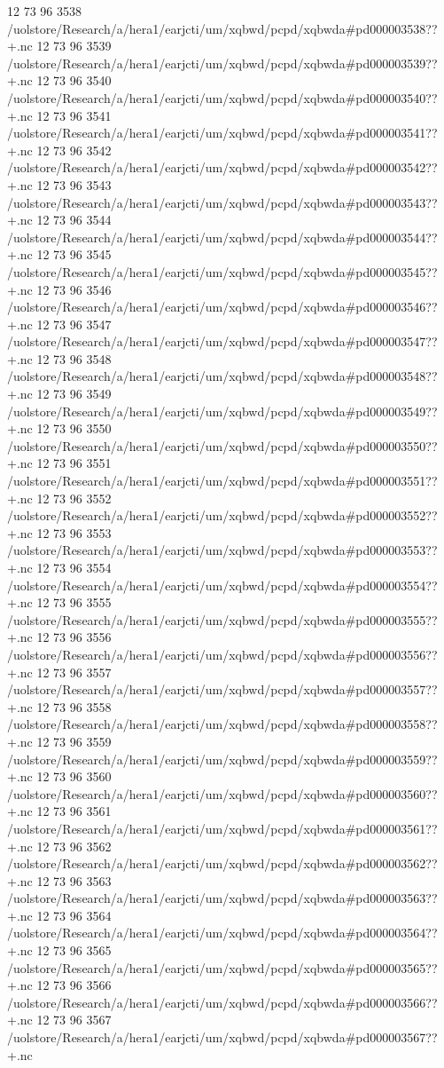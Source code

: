 12 73 96
3538
/uolstore/Research/a/hera1/earjcti/um/xqbwd/pcpd/xqbwda#pd000003538??+.nc
12 73 96
3539
/uolstore/Research/a/hera1/earjcti/um/xqbwd/pcpd/xqbwda#pd000003539??+.nc
12 73 96
3540
/uolstore/Research/a/hera1/earjcti/um/xqbwd/pcpd/xqbwda#pd000003540??+.nc
12 73 96
3541
/uolstore/Research/a/hera1/earjcti/um/xqbwd/pcpd/xqbwda#pd000003541??+.nc
12 73 96
3542
/uolstore/Research/a/hera1/earjcti/um/xqbwd/pcpd/xqbwda#pd000003542??+.nc
12 73 96
3543
/uolstore/Research/a/hera1/earjcti/um/xqbwd/pcpd/xqbwda#pd000003543??+.nc
12 73 96
3544
/uolstore/Research/a/hera1/earjcti/um/xqbwd/pcpd/xqbwda#pd000003544??+.nc
12 73 96
3545
/uolstore/Research/a/hera1/earjcti/um/xqbwd/pcpd/xqbwda#pd000003545??+.nc
12 73 96
3546
/uolstore/Research/a/hera1/earjcti/um/xqbwd/pcpd/xqbwda#pd000003546??+.nc
12 73 96
3547
/uolstore/Research/a/hera1/earjcti/um/xqbwd/pcpd/xqbwda#pd000003547??+.nc
12 73 96
3548
/uolstore/Research/a/hera1/earjcti/um/xqbwd/pcpd/xqbwda#pd000003548??+.nc
12 73 96
3549
/uolstore/Research/a/hera1/earjcti/um/xqbwd/pcpd/xqbwda#pd000003549??+.nc
12 73 96
3550
/uolstore/Research/a/hera1/earjcti/um/xqbwd/pcpd/xqbwda#pd000003550??+.nc
12 73 96
3551
/uolstore/Research/a/hera1/earjcti/um/xqbwd/pcpd/xqbwda#pd000003551??+.nc
12 73 96
3552
/uolstore/Research/a/hera1/earjcti/um/xqbwd/pcpd/xqbwda#pd000003552??+.nc
12 73 96
3553
/uolstore/Research/a/hera1/earjcti/um/xqbwd/pcpd/xqbwda#pd000003553??+.nc
12 73 96
3554
/uolstore/Research/a/hera1/earjcti/um/xqbwd/pcpd/xqbwda#pd000003554??+.nc
12 73 96
3555
/uolstore/Research/a/hera1/earjcti/um/xqbwd/pcpd/xqbwda#pd000003555??+.nc
12 73 96
3556
/uolstore/Research/a/hera1/earjcti/um/xqbwd/pcpd/xqbwda#pd000003556??+.nc
12 73 96
3557
/uolstore/Research/a/hera1/earjcti/um/xqbwd/pcpd/xqbwda#pd000003557??+.nc
12 73 96
3558
/uolstore/Research/a/hera1/earjcti/um/xqbwd/pcpd/xqbwda#pd000003558??+.nc
12 73 96
3559
/uolstore/Research/a/hera1/earjcti/um/xqbwd/pcpd/xqbwda#pd000003559??+.nc
12 73 96
3560
/uolstore/Research/a/hera1/earjcti/um/xqbwd/pcpd/xqbwda#pd000003560??+.nc
12 73 96
3561
/uolstore/Research/a/hera1/earjcti/um/xqbwd/pcpd/xqbwda#pd000003561??+.nc
12 73 96
3562
/uolstore/Research/a/hera1/earjcti/um/xqbwd/pcpd/xqbwda#pd000003562??+.nc
12 73 96
3563
/uolstore/Research/a/hera1/earjcti/um/xqbwd/pcpd/xqbwda#pd000003563??+.nc
12 73 96
3564
/uolstore/Research/a/hera1/earjcti/um/xqbwd/pcpd/xqbwda#pd000003564??+.nc
12 73 96
3565
/uolstore/Research/a/hera1/earjcti/um/xqbwd/pcpd/xqbwda#pd000003565??+.nc
12 73 96
3566
/uolstore/Research/a/hera1/earjcti/um/xqbwd/pcpd/xqbwda#pd000003566??+.nc
12 73 96
3567
/uolstore/Research/a/hera1/earjcti/um/xqbwd/pcpd/xqbwda#pd000003567??+.nc
